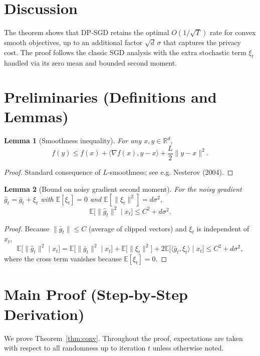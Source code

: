 \documentclass{article}
\newtheorem{lemma}{Lemma}
\newcommand{\EE}{\mathbb{E}}
\newcommand{\RR}{\mathbb{R}}
\begin{document}
\section*{Discussion}
The theorem shows that DP‑SGD retains the optimal $O(1/\sqrt{T})$ rate for
convex smooth objectives, up to an additional factor $\sqrt{d}\,\sigma$ that
captures the privacy cost. The proof follows the classic SGD analysis with
the extra stochastic term $\xi_t$ handled via its zero mean and bounded second
moment.

\newpage
\section*{Preliminaries (Definitions and Lemmas)}
\begin{lemma}[Smoothness inequality]
\label{lem:smooth}
For any $x,y\in\RR^{d}$,
\[
f(y)\le f(x)+\langle\nabla f(x),y-x\rangle+\frac{L}{2}\|y-x\|^{2}.
\]
\end{lemma}
\begin{proof}
Standard consequence of $L$‑smoothness; see e.g. Nesterov (2004). \qedhere
\end{proof}

\begin{lemma}[Bound on noisy gradient second moment]
\label{lem:noise}
For the noisy gradient $\hat g_t=\bar g_t+\xi_t$ with $\EE[\xi_t]=0$ and
$\EE[\|\xi_t\|^{2}]=d\sigma^{2}$,
\[
\EE\!\bigl[\|\hat g_t\|^{2}\mid x_t\bigr]
\le C^{2}+d\sigma^{2}.
\]
\end{lemma}
\begin{proof}
Because $\|\bar g_t\|\le C$ (average of clipped vectors) and $\xi_t$ is
independent of $x_t$,
\[
\EE\!\bigl[\|\hat g_t\|^{2}\mid x_t\bigr]
= \EE\!\bigl[\|\bar g_t\|^{2}\mid x_t\bigr]
     +\EE\!\bigl[\|\xi_t\|^{2}\bigr]
     +2\EE\!\bigl[\langle\bar g_t,\xi_t\rangle\mid x_t\bigr]
\le C^{2}+d\sigma^{2},
\]
where the cross term vanishes because $\EE[\xi_t]=0$. \qedhere
\end{proof}

\newpage
\section*{Main Proof (Step‑by‑Step Derivation)}
We prove Theorem~\ref{thm:conv}. Throughout the proof, expectations are taken
with respect to all randomness up to iteration $t$ unless otherwise noted.
\end{document}
